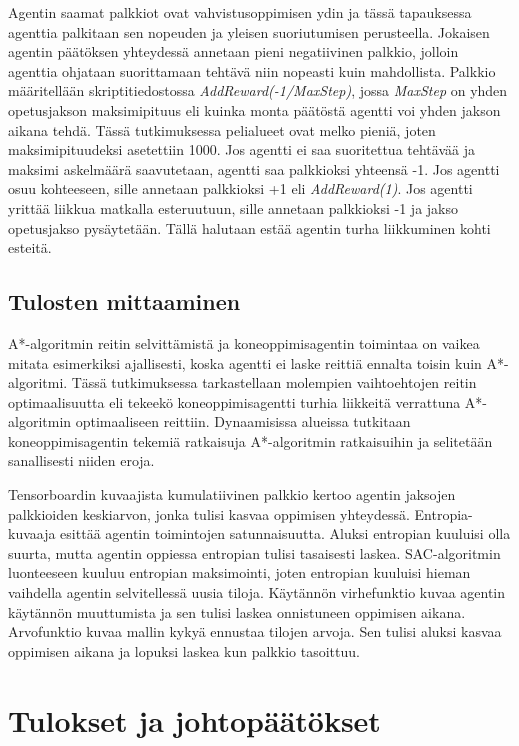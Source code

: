 \documentclass[utf8]{gradu3}
\begin{document}
Agentin saamat palkkiot ovat vahvistusoppimisen ydin ja tässä tapauksessa agenttia palkitaan sen nopeuden ja yleisen suoriutumisen perusteella. Jokaisen agentin päätöksen yhteydessä annetaan pieni negatiivinen palkkio, jolloin agenttia ohjataan suorittamaan tehtävä niin nopeasti kuin mahdollista. Palkkio määritellään skriptitiedostossa \textit{AddReward(-1/MaxStep)}, jossa \textit{MaxStep} on yhden opetusjakson maksimipituus eli kuinka monta päätöstä agentti voi yhden jakson aikana tehdä. Tässä tutkimuksessa pelialueet ovat melko pieniä, joten maksimipituudeksi asetettiin 1000. Jos agentti ei saa suoritettua tehtävää ja maksimi askelmäärä saavutetaan, agentti saa palkkioksi yhteensä -1. Jos agentti osuu kohteeseen, sille annetaan palkkioksi +1 eli \textit{AddReward(1)}. Jos agentti yrittää liikkua matkalla esteruutuun, sille annetaan palkkioksi -1 ja jakso opetusjakso pysäytetään. Tällä halutaan estää agentin turha liikkuminen kohti esteitä.

\section{Tulosten mittaaminen}
\label{sec:mittaaminen}

A*-algoritmin reitin selvittämistä ja koneoppimisagentin toimintaa on vaikea mitata esimerkiksi ajallisesti, koska agentti ei laske reittiä ennalta toisin kuin A*-algoritmi. Tässä tutkimuksessa tarkastellaan molempien vaihtoehtojen reitin optimaalisuutta eli tekeekö koneoppimisagentti turhia liikkeitä verrattuna A*-algoritmin optimaaliseen reittiin. Dynaamisissa alueissa tutkitaan koneoppimisagentin tekemiä ratkaisuja A*-algoritmin ratkaisuihin ja selitetään sanallisesti niiden eroja.

Tensorboardin kuvaajista kumulatiivinen palkkio kertoo agentin jaksojen palkkioiden keskiarvon, jonka tulisi kasvaa oppimisen yhteydessä. Entropia-kuvaaja esittää agentin toimintojen satunnaisuutta. Aluksi entropian kuuluisi olla suurta, mutta agentin oppiessa entropian tulisi tasaisesti laskea. SAC-algoritmin luonteeseen kuuluu entropian maksimointi, joten entropian kuuluisi hieman vaihdella agentin selvitellessä uusia tiloja. Käytännön virhefunktio kuvaa agentin käytännön muuttumista ja sen tulisi laskea onnistuneen oppimisen aikana. Arvofunktio kuvaa mallin kykyä ennustaa tilojen arvoja. Sen tulisi aluksi kasvaa oppimisen aikana ja lopuksi laskea kun palkkio tasoittuu.

\chapter{Tulokset ja johtopäätökset}
\label{tulokset}
\end{document}
